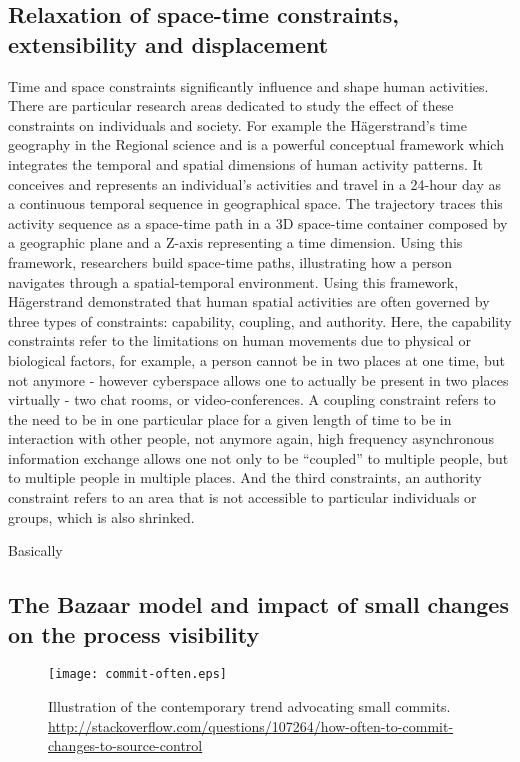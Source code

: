 \subsection{Relaxation of space-time constraints, extensibility and displacement}
Time and space constraints significantly influence and shape human activities. There are 
particular research areas dedicated to study the effect of these constraints on individuals 
and society. For example the Hägerstrand's time geography in the Regional science and is 
a powerful conceptual framework which integrates the temporal and spatial dimensions of
human activity patterns. It conceives and represents an individual’s activities and travel 
in a 24-hour day as a continuous temporal sequence in geographical space. The trajectory 
traces this activity sequence as a space-time path in a 3D space-time container composed by a
geographic plane and a Z-axis representing a time dimension. Using this framework, researchers
build space-time paths, illustrating how a person navigates through a spatial-temporal environment.
Using this framework, Hägerstrand demonstrated that human spatial activities are often governed by
three types of constraints: capability, coupling, and authority. Here, the capability constraints
refer to the limitations on human movements due to physical or biological factors, for
example, a person cannot be in two places at one time, but not anymore - however cyberspace allows 
one to actually be present in two places virtually - two chat rooms, or video-conferences.
A coupling constraint refers to the need to be in one particular place for a given length of time 
to be in interaction with other people, not anymore again, high frequency asynchronous
information exchange allows one not only to be ``coupled'' to multiple people, but to multiple 
people in multiple places. And the third constraints, an authority constraint refers to an 
area that is not accessible to particular individuals or groups, which is also shrinked.

Basically

\subsection{The Bazaar model and impact of small changes on the process visibility}
\begin{figure}[tbp]
   \centering
   \texttt{[image: commit-often.eps]}
   \caption{Illustration of the contemporary trend advocating small commits. 
\url{http://stackoverflow.com/questions/107264/how-often-to-commit-changes-to-source-control}}
   \label{fig:commit-often}
\end{figure}


